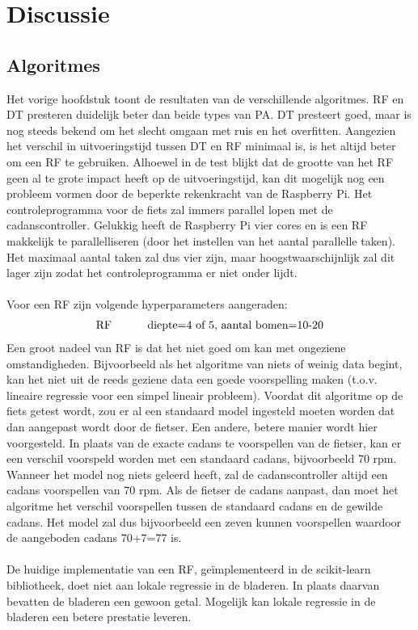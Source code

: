 \chapter{Discussie}
\section{Algoritmes}
Het vorige hoofdstuk toont de resultaten van de verschillende algoritmes. RF en DT presteren duidelijk beter dan beide types van PA. DT presteert goed, maar is nog steeds bekend om het slecht omgaan met ruis en het overfitten. Aangezien het verschil in uitvoeringstijd tussen DT en RF minimaal is, is het altijd beter om een RF te gebruiken. Alhoewel in de test blijkt dat de grootte van het RF geen al te grote impact heeft op de uitvoeringstijd, kan dit mogelijk nog een probleem vormen door de beperkte rekenkracht van de Raspberry Pi. Het controleprogramma voor de fiets zal immers parallel lopen met de cadanscontroller. Gelukkig heeft de Raspberry Pi vier cores en is een RF makkelijk te parallelliseren (door het instellen van het aantal parallelle taken). Het maximaal aantal taken zal dus vier zijn, maar hoogstwaarschijnlijk zal dit lager zijn zodat het controleprogramma er niet onder lijdt.
\\\\
Voor een RF zijn volgende hyperparameters aangeraden:
\begin{gather*}
\text{RF \tab diepte=4 of 5, aantal bomen=10-20}
\end{gather*}
Een groot nadeel van RF is dat het niet goed om kan met ongeziene omstandigheden. Bijvoorbeeld als het algoritme van niets of weinig data begint, kan het niet uit de reeds geziene data een goede voorspelling maken (t.o.v. lineaire regressie voor een simpel lineair probleem). Voordat dit algoritme op de fiets getest wordt, zou er al een standaard model ingesteld moeten worden dat dan aangepast wordt door de fietser. Een andere, betere manier wordt hier voorgesteld. In plaats van de exacte cadans te voorspellen van de fietser, kan er een verschil voorspeld worden met een standaard cadans, bijvoorbeeld 70 rpm. Wanneer het model nog niets geleerd heeft, zal de cadanscontroller altijd een cadans voorspellen van 70 rpm. Als de fietser de cadans aanpast, dan moet het algoritme het verschil voorspellen tussen de standaard cadans en de gewilde cadans. Het model zal dus bijvoorbeeld een zeven kunnen voorspellen waardoor de aangeboden cadans 70+7=77 is.
\\\\
De huidige implementatie van een RF, geïmplementeerd in de scikit-learn bibliotheek, doet niet aan lokale regressie in de bladeren. In plaats daarvan bevatten de bladeren een gewoon getal. Mogelijk kan lokale regressie in de bladeren een betere prestatie leveren.
